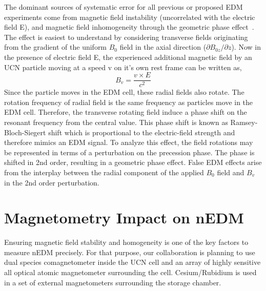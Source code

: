 The dominant sources of systematic error for all previous or proposed
EDM experiments come from magnetic field instability (uncorrelated
with the electric field E), and magnetic field inhomogeneity through
the geometric phase effect~\cite{PhysRevA.70.032102}.  The effect is
easiest to understand by considering transverse fields originating
from the gradient of the uniform $B_0$ field in the axial direction
($\partial B_{0z}/{\partial z}$).  Now in the presence of electric
field E, the experienced additional magnetic field by an UCN particle
moving at a speed v on it’s own rest frame can be written as,
\begin{equation}
  B_v=\frac{v\times E}{c^2}
  \label{equation:phase effect}
\end{equation}
Since the particle moves in the EDM cell, these radial fields also
rotate. The rotation frequency of radial field is the same frequency
as particles move in the EDM cell.  Therefore, the transverse rotating
field induce a phase shift on the resonant frequency from the central
value.  This phase shift is known as Ramsey-Bloch-Siegert shift which
is proportional to the electric-field strength and therefore mimics an
EDM signal.  To analyze this effect, the field rotations may be
represented in terms of a perturbation on the precession phase. The
phase is shifted in 2nd order, resulting in a geometric phase effect.
False EDM effects arise from the interplay between the radial
component of the applied $B_0$ field and $B_v$ in the 2nd order
perturbation.

\section{ Magnetometry Impact on nEDM}
Ensuring magnetic field stability and homogeneity is one of the key
factors to measure nEDM precisely. For that purpose, our collaboration
is planning to use dual species comagnetometer inside the UCN cell and
an array of highly sensitive all optical atomic magnetometer
surrounding the cell. Cesium/Rubidium is used in a set of external
magnetometers surrounding the storage chamber.

